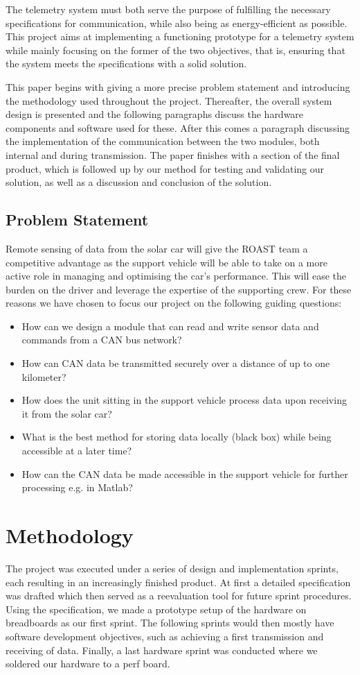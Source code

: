 \documentclass[conference]{IEEEtran}
\begin{document}
The telemetry system must both serve the purpose of fulfilling the necessary specifications for communication, while also being as energy-efficient as possible. This project aims at implementing a functioning prototype for a telemetry system while mainly focusing on the former of the two objectives, that is, ensuring that the system meets the specifications with a solid solution.

This paper begins with giving a more precise problem statement and introducing the methodology used throughout the project. Thereafter, the overall system design is presented and the following paragraphs discuss the hardware components and software used for these. After this comes a paragraph discussing the implementation of the communication between the two modules, both internal and during transmission. The paper finishes with a section of the final product, which is followed up by our method for testing and validating our solution, as well as a discussion and conclusion of the solution.

\subsection{Problem Statement}
Remote sensing of data from the solar car will give the ROAST team a competitive advantage as the support vehicle will be able to take on a more active role in managing and optimising the car's performance. This will ease the burden on the driver and leverage the expertise of the supporting crew. For these reasons we have chosen to focus our project on the following guiding questions:
\begin{itemize}
    \item How can we design a module that can read and write sensor data and commands from a CAN bus network? 
    \item How can CAN data be transmitted securely over a distance of up to one kilometer?
    \item How does the unit sitting in the support vehicle process data upon receiving it from the solar car?
    \item What is the best method for storing data locally (black box) while being accessible at a later time?
    \item How can the CAN data be made accessible in the support vehicle for further processing e.g. in Matlab?
\end{itemize}

\section{Methodology}
The project was executed under a series of design and implementation sprints, each resulting in an increasingly finished product. At first a detailed specification was drafted which then served as a reevaluation tool for future sprint procedures. Using the specification, we made a prototype setup of the hardware on breadboards as our first sprint. The following sprints would then mostly have software development objectives, such as achieving a first transmission and receiving of data. Finally, a last hardware sprint was conducted where we soldered our hardware to a perf board.
\end{document}

